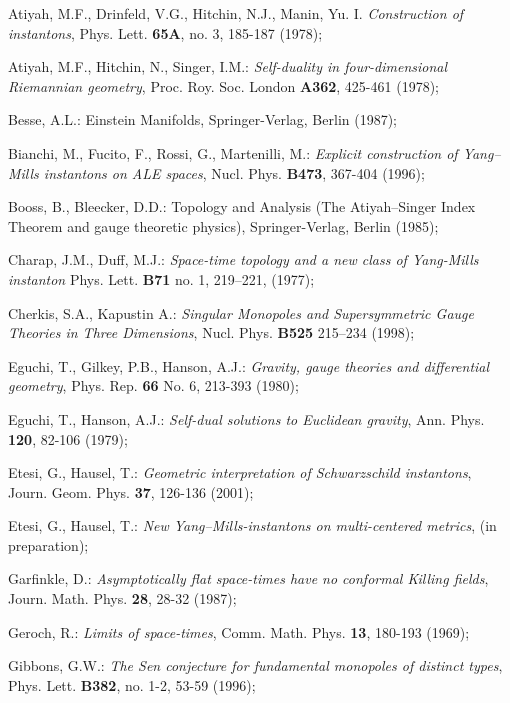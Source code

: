 \documentclass[a4paper,12pt,draft]{article}
\begin{document}
\begin{thebibliography}{99}

 Atiyah, M.F., Drinfeld, V.G., Hitchin, N.J.,
Manin, Yu. I. {\it Construction of instantons}, Phys. Lett. {\bf 65A},
no. 3, 185-187 (1978);
 
 Atiyah, M.F., Hitchin, N., Singer, I.M.: {\it
Self-duality in four-dimensional Riemannian geometry},
Proc. Roy. Soc. London {\bf A362}, 425-461 (1978);

 Besse, A.L.: Einstein Manifolds, Springer-Verlag, Berlin
(1987);

 Bianchi, M., Fucito, F., Rossi, G., Martenilli,
M.: {\it Explicit construction of Yang--Mills instantons on ALE spaces},
Nucl. Phys. {\bf B473}, 367-404 (1996); 

 Booss, B., Bleecker, D.D.: Topology and
Analysis (The Atiyah--Singer Index Theorem and gauge theoretic physics),
Springer-Verlag, Berlin (1985);

 Charap, J.M., Duff, M.J.: 
{\it Space-time topology and a new class of Yang-Mills instanton} 
Phys. Lett. {\bf B71} no. 1, 219--221, (1977); 

 Cherkis, S.A., Kapustin A.: {\it 
Singular Monopoles and Supersymmetric Gauge Theories in Three Dimensions},
Nucl. Phys. {\bf B525} 215--234 (1998); 

 Eguchi, T., Gilkey, P.B., Hanson, A.J.: {\it 
Gravity, gauge theories and differential geometry}, Phys. Rep. {\bf 66}
No. 6, 213-393 (1980);

 Eguchi, T., Hanson, A.J.:  {\it Self-dual solutions to
Euclidean gravity}, Ann. Phys. {\bf 120}, 82-106 (1979);

 Etesi, G., Hausel, T.: {\it Geometric interpretation of 
Schwarzschild instantons}, Journ. Geom. Phys. {\bf 37}, 126-136 (2001);

 Etesi, G., Hausel, T.: {\it New Yang--Mills-instantons
on multi-centered metrics}, (in preparation);

 Garfinkle, D.: {\it Asymptotically flat space-times have no
conformal Killing fields}, Journ. Math. Phys. {\bf 28}, 28-32 (1987);

 Geroch, R.: {\it Limits of space-times},
Comm. Math. Phys. {\bf 13}, 180-193 (1969);

 Gibbons, G.W.: {\it The Sen conjecture for fundamental
monopoles of distinct types}, Phys. Lett. {\bf B382}, no. 1-2,
53-59 (1996);


\end{thebibliography}
\end{document}
